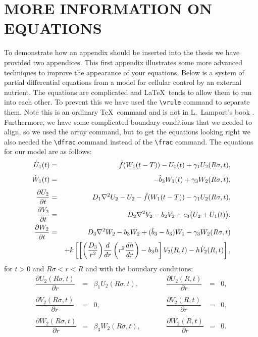 \appendices
%
%

\chapter{MORE INFORMATION ON EQUATIONS}

To demonstrate how an appendix should be inserted into the thesis we
have provided two appendices. This first appendix illustrates some
more advanced techniques to improve the appearance of your equations.
Below is a system of partial differential equations from a model for
cellular control by an external nutrient. The equations are
complicated and \LaTeX\ tends to allow them to run into each other. To
prevent this we have used the \verb+\vrule+ command to separate
them. Note this is an ordinary \TeX\ command and is not in L.\
Lamport's book \cite{LAM}. Furthermore, we have some complicated
boundary conditions that we needed to align, so we used the array
command, but to get the equations looking right we also needed the
\verb+\dfrac+ command instead of the \verb+\frac+ command. The
equations for our model are as follows:
\begin{eqnarray}
  \dot{U}_1(t) & = & \tilde f(W_1(t-T)) - U_1(t) + \gamma_1U_2(R\sigma,
   t){\vrule width 0in depth .1in},	\nonumber \\
  \dot{W}_1(t) & = & -\hat b_3W_1(t) + \gamma_3W_2(R\sigma,
   t){\vrule width 0in depth .1in},\nonumber \\
  \frac{\partial U_2}{\partial t} & = & D_1\nabla^2U_2 - U_2 - \tilde f(W_1
    (t-T)) - \gamma_1U_2(R\sigma,t){\vrule width 0in depth .1in},
	\label{sys2} \\
  \frac{\partial V_2}{\partial t} & = & D_2\nabla^2V_2 - b_2V_2 + c_0
    \bigl(U_2 + U_1(t)\bigr){\vrule width 0in depth .1in}, \nonumber \\
  \frac{\partial W_2}{\partial t} & = & D_3\nabla^2W_2 - b_3W_2 + (\hat b_3
    -b_3)W_1 - \gamma_3W_2(R\sigma,t) \nonumber \\
    &  & + k\left[\left[{\left(\frac{D_3}{r^2}\right)}\frac{d}{dr}\left(r^2
	   \frac{dh}{dr}\right) - b_3h\right]V_2(R,t) - h\dot V_2(R,t)
	   \right], \nonumber
\end{eqnarray}
for $t > 0$ and $R\sigma < r < R$ and with the boundary conditions:
\begin{equation*}
\begin{array}{rclcrcl}
 \dfrac{\partial U_2(R\sigma,t)}{\partial r} & = &
   \beta_1U_2(R\sigma,t), & \qquad &
 \dfrac{\partial U_2(R,t)}{\partial r} & = &
   0, \\
\\
 \dfrac{\partial V_2(R\sigma,t)}{\partial r} & = &
   0, & \qquad &
 \dfrac{\partial V_2(R,t)}{\partial r} & = &
   0, \\
\\
 \dfrac{\partial W_2(R\sigma,t)}{\partial r} & = &
   \beta_3W_2(R\sigma,t), & \qquad &
 \dfrac{\partial W_2(R,t)}{\partial r} & = &
   0.
\end{array}
\end{equation*}

